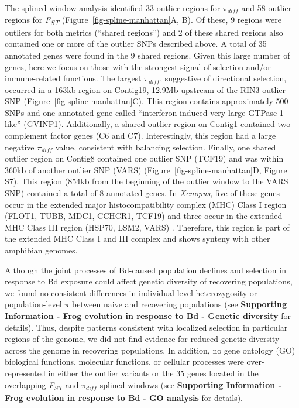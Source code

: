 \documentclass[9pt,twocolumn,twoside,lineno]{pnas-new}
\begin{document}
The splined window analysis identified 33 outlier regions for
\(\pi_{diff}\) and 58 outlier regions for \emph{F\textsubscript{ST}}
(Figure~\ref{fig-spline-manhattan}A, B). Of these, 9 regions were
outliers for both metrics (``shared regions'') and 2 of these shared
regions also contained one or more of the outlier SNPs described above.
A total of 35 annotated genes were found in the 9 shared regions. Given
this large number of genes, here we focus on those with the strongest
signal of selection and/or immune-related functions. The largest
\(\pi_{diff}\), suggestive of directional selection, occurred in a 163kb
region on Contig19, 12.9Mb upstream of the RIN3 outlier SNP
(Figure~\ref{fig-spline-manhattan}C). This region contains
approximately 500 SNPs and one annotated gene called
``interferon-induced very large GTPase 1-like'' (GVINP1). Additionally,
a shared outlier region on Contig1 contained two complement factor genes
(C6 and C7). Interestingly, this region had a large negative
\(\pi_{diff}\) value, consistent with balancing selection. Finally, one
shared outlier region on Contig8 contained one outlier SNP (TCF19) and
was within 360kb of another outlier SNP (VARS)
(Figure~\ref{fig-spline-manhattan}D, Figure S7).
This region (854kb from the beginning of the outlier window to the VARS
SNP) contained a total of 8 annotated genes. In \emph{Xenopus}, five of
these genes occur in the extended major histocompatibility complex (MHC)
Class I region (FLOT1, TUBB, MDC1, CCHCR1, TCF19) and three occur in the
extended MHC Class III region (HSP70, LSM2, VARS) \citep{ohta2006}.
Therefore, this region is part of the extended MHC Class I and III
complex and shows synteny with other amphibian genomes.

Although the joint processes of Bd-caused population declines and
selection in response to Bd exposure could affect genetic diversity of
recovering populations, we found no consistent differences in
individual-level heterozygosity or population-level \(\pi\) between
naive and recovering populations (see \textbf{Supporting Information -
Frog evolution in response to Bd - Genetic diversity} for details).
Thus, despite patterns consistent with localized selection in particular
regions of the genome, we did not find evidence for reduced genetic
diversity across the genome in recovering populations. In addition, no
gene ontology (GO) biological functions, molecular functions, or
cellular processes were over-represented in either the outlier variants
or the 35 genes located in the overlapping \emph{F\textsubscript{ST}}
and \(\pi_{diff}\) splined windows (see \textbf{Supporting Information -
Frog evolution in response to Bd} \textbf{- GO analysis} for details).
\end{document}
